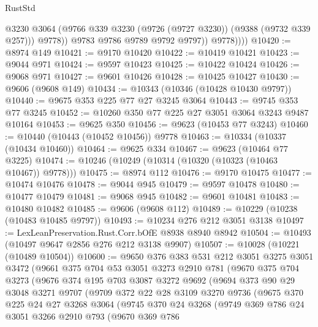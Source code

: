 \begin{lexlean}{RustStd}
\begin{coremodule}
                    @3230
                    @3064
                    (@9766 @339 @3230 (@9726 (@9727 @3230)) (@9388 (@9732 @339 @257)))
                    @9778))
                @9783
                @9786
                @9789
                @9792
                @9797))
            @9778))))
@10420 := @8974 @149
@10421 := @9170 @10420
@10422 := @10419 @10421
@10423 := @9044 @971
@10424 := @9597 @10423
@10425 := @10422 @10424
@10426 := @9068 @971
@10427 := @9601 @10426
@10428 := @10425 @10427
@10430 := @9606 (@9608 @149)
@10434 := @10343 (@10346 (@10428 @10430 @9797))
@10440 := @9675 @353 @225 @77 @27 @3245 @3064
@10443 := @9745 @353 @77 @3245
@10452 := @10260 @350 @77 @225 @27 @3051 @3064 @3243 @9487 @10164
@10453 := @9625 @350
@10456 := @9623 (@10453 @77 @3243)
@10460 := @10440 (@10443 (@10452 @10456)) @9778
@10463 := @10334 (@10337 (@10434 @10460))
@10464 := @9625 @334
@10467 := @9623 (@10464 @77 @3225)
@10474 := @10246 (@10249 (@10314 (@10320 (@10323 (@10463 @10467)) @9778)))
@10475 := @8974 @112
@10476 := @9170 @10475
@10477 := @10474 @10476
@10478 := @9044 @945
@10479 := @9597 @10478
@10480 := @10477 @10479
@10481 := @9068 @945
@10482 := @9601 @10481
@10483 := @10480 @10482
@10485 := @9606 (@9608 @112)
@10489 := @10229 (@10238 (@10483 @10485 @9797))
@10493 := @10234 @276 @212 @3051 @3138
@10497 := LexLeanPreservation.Rust.Corr.bOfE @8938 @8940 @8942
@10504 := @10493 (@10497 @9647 @2856 @276 @212 @3138 @9907)
@10507 := @10028 (@10221 (@10489 @10504))
@10600 := @9650
    @376
    @383
    @531
    @212
    @3051
    @3275
    @3051
    @3472
    (@9661
      @375
      @704
      @53
      @3051
      @3273
      @2910
      @781
      (@9670
        @375
        @704
        @3273
        (@9676
          @374
          @195
          @703
          @3087
          @3272
          @9692
          (@9694
            @373
            @90
            @29
            @3048
            @3271
            @9707
            (@9709
              @372
              @22
              @28
              @3109
              @3270
              @9736
              (@9675
                @370
                @225
                @24
                @27
                @3268
                @3064
                (@9745
                  @370
                  @24
                  @3268
                  (@9749
                    @369
                    @786
                    @24
                    @3051
                    @3266
                    @2910
                    @793
                    (@9670
                      @369
                      @786

\end{coremodule}
\end{lexlean}
